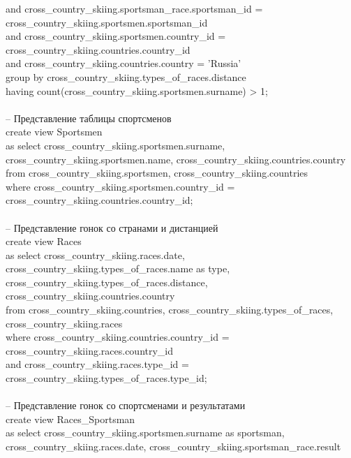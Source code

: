 \documentclass[a4paper,12pt]{article}
\begin{document}
\indent \indent and cross\_country\_skiing.sportsman\_race.sportsman\_id = cross\_country\_skiing.sportsmen.sportsman\_id \\
\indent \indent and cross\_country\_skiing.sportsmen.country\_id = cross\_country\_skiing.countries.country\_id\\
\indent \indent and cross\_country\_skiing.countries.country = 'Russia'\\
\indent group by cross\_country\_skiing.types\_of\_races.distance\\
\indent having count(cross\_country\_skiing.sportsmen.surname) > 1;\\
\\
-- Представление таблицы спортсменов\\
create view Sportsmen\\
as select cross\_country\_skiing.sportsmen.surname, cross\_country\_skiing.sportsmen.name, cross\_country\_skiing.countries.country\\
\indent from cross\_country\_skiing.sportsmen, cross\_country\_skiing.countries\\
\indent \indent where cross\_country\_skiing.sportsmen.country\_id = cross\_country\_skiing.countries.country\_id;\\
\\
-- Представление гонок со странами и дистанцией\\
create view Races\\
as select cross\_country\_skiing.races.date, cross\_country\_skiing.types\_of\_races.name as type,\\
\indent cross\_country\_skiing.types\_of\_races.distance, cross\_country\_skiing.countries.country\\
\indent from cross\_country\_skiing.countries, cross\_country\_skiing.types\_of\_races, cross\_country\_skiing.races\\
\indent where cross\_country\_skiing.countries.country\_id = cross\_country\_skiing.races.country\_id \\
\indent and cross\_country\_skiing.races.type\_id = cross\_country\_skiing.types\_of\_races.type\_id;\\
\\
-- Представление гонок со спортсменами и результатами\\
create view Races\_Sportsman\\
as select cross\_country\_skiing.sportsmen.surname as sportsman, cross\_country\_skiing.races.date, cross\_country\_skiing.sportsman\_race.result\\
\end{document}
